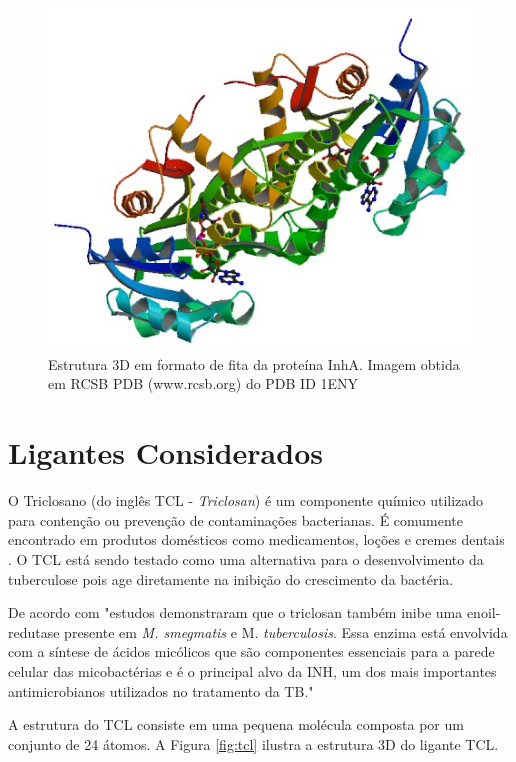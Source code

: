 \begin{figure}[h]
	\center
	\includegraphics[width=14cm]{images/inha.png}
	\caption{Estrutura 3D em formato de fita da proteína InhA. Imagem obtida em RCSB PDB (www.rcsb.org) do PDB ID 1ENY}
	\label{fig:inha}
\end{figure}

\section{Ligantes Considerados}

O Triclosano (do inglês TCL - \emph{Triclosan}) é um componente químico utilizado para contenção ou prevenção de contaminações bacterianas. É comumente encontrado em produtos domésticos como medicamentos, loções e cremes dentais \cite{TCL}. O TCL está sendo testado como uma alternativa para o desenvolvimento da tuberculose pois age diretamente na inibição do crescimento da bactéria.

De acordo com \cite{GAU08} "estudos demonstraram que o triclosan também inibe uma enoil-redutase presente em \emph{M. smegmatis} e M. \emph{tuberculosis}. Essa enzima está envolvida com a síntese de ácidos micólicos que são componentes essenciais para a parede celular das  micobactérias e é o principal alvo da INH, um dos mais importantes antimicrobianos utilizados no tratamento da TB."

A estrutura do TCL consiste em uma pequena molécula composta por um conjunto de 24 átomos. A Figura \ref{fig:tcl} ilustra a estrutura 3D do ligante TCL.

